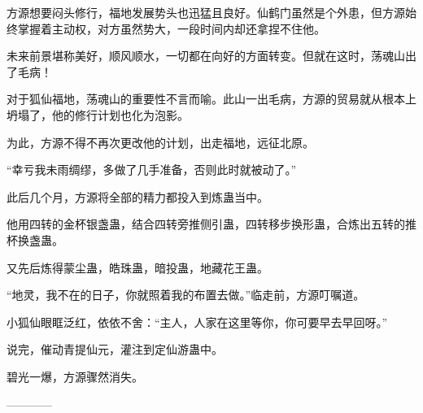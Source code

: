 \begin{this_body}
方源想要闷头修行，福地发展势头也迅猛且良好。仙鹤门虽然是个外患，但方源始终掌握着主动权，对方虽然势大，一段时间内却还拿捏不住他。

未来前景堪称美好，顺风顺水，一切都在向好的方面转变。但就在这时，荡魂山出了毛病！

对于狐仙福地，荡魂山的重要性不言而喻。此山一出毛病，方源的贸易就从根本上坍塌了，他的修行计划也化为泡影。

为此，方源不得不再次更改他的计划，出走福地，远征北原。

“幸亏我未雨绸缪，多做了几手准备，否则此时就被动了。”

此后几个月，方源将全部的精力都投入到炼蛊当中。

他用四转的金杯银盏蛊，结合四转旁推侧引蛊，四转移步换形蛊，合炼出五转的推杯换盏蛊。

又先后炼得蒙尘蛊，皓珠蛊，暗投蛊，地藏花王蛊。

“地灵，我不在的日子，你就照着我的布置去做。”临走前，方源叮嘱道。

小狐仙眼眶泛红，依依不舍：“主人，人家在这里等你，你可要早去早回呀。”

说完，催动青提仙元，灌注到定仙游蛊中。

碧光一爆，方源骤然消失。

------------

\end{this_body}

